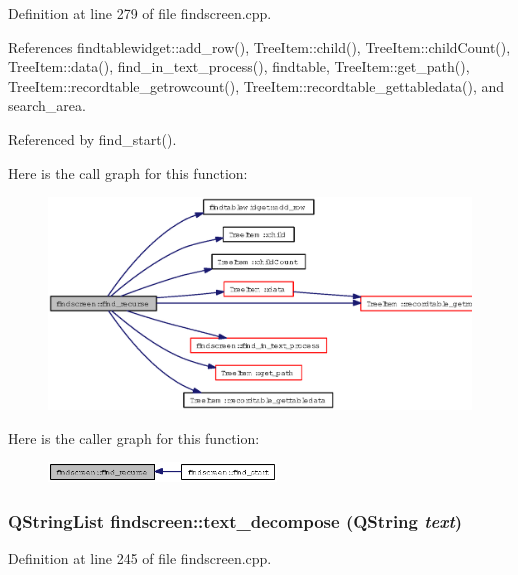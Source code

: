 Definition at line 279 of file findscreen.cpp.

References findtablewidget::add\_\-row(), Tree\-Item::child(), Tree\-Item::child\-Count(), Tree\-Item::data(), find\_\-in\_\-text\_\-process(), findtable, Tree\-Item::get\_\-path(), Tree\-Item::recordtable\_\-getrowcount(), Tree\-Item::recordtable\_\-gettabledata(), and search\_\-area.

Referenced by find\_\-start().

Here is the call graph for this function:\begin{figure}[H]
\begin{center}
\leavevmode
\includegraphics[width=324pt]{classfindscreen_b962b1004be0e8afb8123a108d9cf73a_cgraph}
\end{center}
\end{figure}


Here is the caller graph for this function:\begin{figure}[H]
\begin{center}
\leavevmode
\includegraphics[width=172pt]{classfindscreen_b962b1004be0e8afb8123a108d9cf73a_icgraph}
\end{center}
\end{figure}
\subsubsection{\setlength{\rightskip}{0pt plus 5cm}QString\-List findscreen::text\_\-decompose (QString {\em text})\hspace{0.3cm}{\tt  [private]}}\label{classfindscreen_b5b73fe86f25f27694aabb126539f8f2}




Definition at line 245 of file findscreen.cpp.

